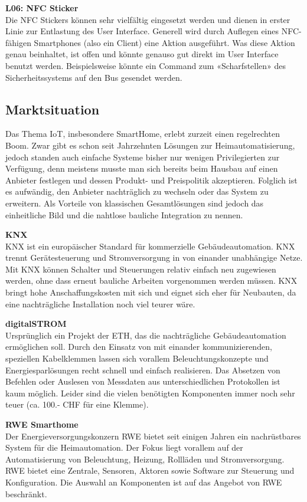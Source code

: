 \textbf{L06: NFC Sticker} \\
Die NFC Stickers können sehr vielfältig eingesetzt werden und dienen in erster Linie zur Entlastung des User Interface. Generell wird durch Auflegen eines NFC-fähigen Smartphones (also ein Client) eine Aktion ausgeführt. Was diese Aktion genau beinhaltet, ist offen und könnte genauso gut direkt im User Interface benutzt werden. Beispielsweise könnte ein Command zum «Scharfstellen» des Sicherheitssystems auf den Bus gesendet werden.

\subsection{Marktsituation}
Das Thema IoT, insbesondere SmartHome, erlebt zurzeit einen regelrechten Boom. Zwar gibt es schon seit Jahrzehnten Lösungen zur Heimautomatisierung, jedoch standen auch einfache Systeme bisher nur wenigen Privilegierten zur Verfügung, denn meistens musste man sich bereits beim Hausbau auf einen Anbieter  festlegen und dessen Produkt- und Preispolitik akzeptieren. Folglich ist es aufwändig, den Anbieter nachträglich zu wechseln oder das System zu erweitern. Als Vorteile von klassischen Gesamtlösungen sind jedoch das einheitliche Bild und die nahtlose bauliche Integration zu nennen.

\textbf{KNX} \\
KNX ist ein europäischer Standard für kommerzielle Gebäudeautomation. KNX trennt Gerätesteuerung und Stromversorgung in von einander unabhängige Netze. Mit KNX können Schalter und Steuerungen relativ einfach neu zugewiesen werden, ohne dass erneut bauliche Arbeiten vorgenommen werden müssen. KNX bringt hohe Anschaffungskosten mit sich und eignet sich eher für Neubauten, da eine nachträgliche Installation noch viel teurer wäre.

\textbf{digitalSTROM} \\
Ursprünglich ein Projekt der ETH, das die nachträgliche Gebäudeautomation ermöglichen soll. Durch den Einsatz von mit einander kommunizierenden, speziellen Kabelklemmen lassen sich vorallem Beleuchtungskonzepte und Energiesparlösungen recht schnell und einfach realisieren. Das Absetzen von Befehlen oder Auslesen von Messdaten aus unterschiedlichen Protokollen ist kaum möglich. Leider sind die vielen benötigten Komponenten immer noch sehr teuer (ca. 100.- CHF für eine Klemme). 

\textbf{RWE Smarthome} \\
Der Energieversorgungskonzern RWE bietet seit einigen Jahren ein nachrüstbares System für die Heimautomation. Der Fokus liegt vorallem auf der Automatisierung von Beleuchtung, Heizung, Rollläden und Stromversorgung. RWE bietet eine Zentrale, Sensoren, Aktoren sowie Software zur Steuerung und Konfiguration. Die Auswahl an Komponenten ist auf das Angebot von RWE beschränkt.

